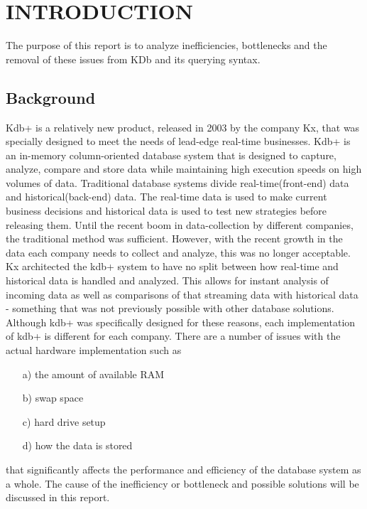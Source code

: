 \section{INTRODUCTION} %
\label{sec:introduction}
	The purpose of this report is to analyze inefficiencies, bottlenecks and the removal of these issues from KDb and its querying syntax.
	
	\subsection{Background} %
	\label{sub:background}
Kdb+ is a relatively new product, released in 2003 by the company Kx, that was specially designed to meet the needs of lead-edge real-time businesses. Kdb+ is an in-memory column-oriented database system that is designed to capture, analyze, compare and store data while maintaining high execution speeds on high volumes of data. \cite{FAQ}  Traditional database systems divide real-time(front-end) data and historical(back-end) data.  The real-time data is used to make current business decisions and historical data is used to test new strategies before releasing them.  Until the recent boom in data-collection by different companies, the traditional method was sufficient.  However, with the recent growth in the data each company needs to collect and analyze, this was no longer acceptable.  Kx architected the kdb+ system to have no split between how real-time and historical data is handled and analyzed.  This allows for instant analysis of incoming data as well as comparisons of that streaming data with historical data - something that was not previously possible with other database solutions.\\

Although kdb+ was specifically designed for these reasons, each implementation of kdb+ is different for each company.  There are a number of issues with the actual hardware implementation such as
	\begin{enumerate}
		\item[a)] the amount of available RAM
		\item[b)] swap space
		\item[c)] hard drive setup
		\item[d)] how the data is stored
	\end{enumerate}
that significantly affects the performance and efficiency of the database system as a whole. The cause of the inefficiency or bottleneck and possible solutions will be discussed in this report.\\

